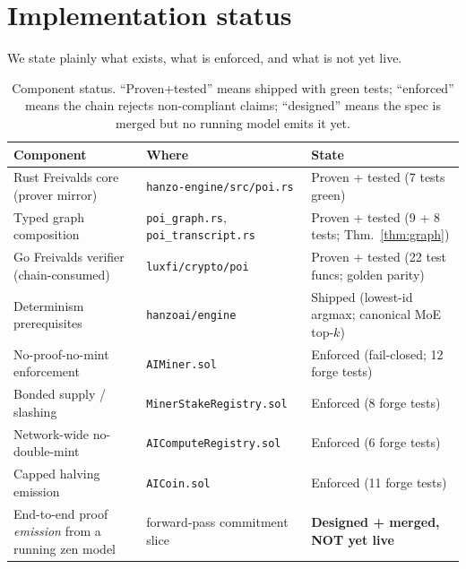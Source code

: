 \documentclass[11pt]{article}
\newcommand{\code}[1]{\texttt{#1}}
\begin{document}
\section{Implementation status}
\label{sec:status}

We state plainly what exists, what is enforced, and what is not yet live.

\begin{table}[H]
\centering
\caption{Component status. ``Proven+tested'' means shipped with green tests;
``enforced'' means the chain rejects non-compliant claims; ``designed'' means
the spec is merged but no running model emits it yet.}
\label{tab:status}
\begin{tabular}{p{4.6cm} p{2.6cm} p{4.4cm}}
\toprule
\textbf{Component} & \textbf{Where} & \textbf{State} \\
\midrule
Rust Freivalds core (prover mirror) &
  \code{hanzo-engine/src/poi.rs} &
  Proven + tested (7 tests green) \\
\addlinespace
Typed graph composition &
  \code{poi\_graph.rs}, \code{poi\_transcript.rs} &
  Proven + tested (9 + 8 tests; Thm.~\ref{thm:graph}) \\
\addlinespace
Go Freivalds verifier (chain-consumed) &
  \code{luxfi/crypto/poi} &
  Proven + tested (22 test funcs; golden parity) \\
\addlinespace
Determinism prerequisites &
  \code{hanzoai/engine} &
  Shipped (lowest-id argmax; canonical MoE top-$k$) \\
\addlinespace
No-proof-no-mint enforcement &
  \code{AIMiner.sol} &
  Enforced (fail-closed; 12 forge tests) \\
\addlinespace
Bonded supply / slashing &
  \code{MinerStakeRegistry.sol} &
  Enforced (8 forge tests) \\
\addlinespace
Network-wide no-double-mint &
  \code{AIComputeRegistry.sol} &
  Enforced (6 forge tests) \\
\addlinespace
Capped halving emission &
  \code{AICoin.sol} &
  Enforced (11 forge tests) \\
\addlinespace
End-to-end proof \emph{emission} from a running zen model &
  forward-pass commitment slice &
  \textbf{Designed + merged, NOT yet live} \\
\bottomrule
\end{tabular}
\end{table}
\end{document}
